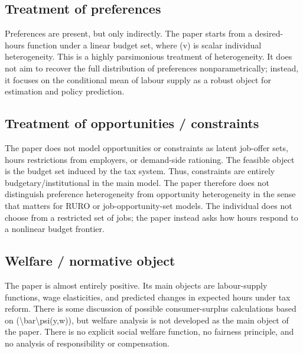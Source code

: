 \documentclass[11pt,a4paper]{article}
\begin{document}
\subsection*{Treatment of preferences}
Preferences are present, but only indirectly. The paper starts from a desired-hours function under a linear budget set, where (v) is scalar individual heterogeneity. This is a highly parsimonious treatment of heterogeneity. It does not aim to recover the full distribution of preferences nonparametrically; instead, it focuses on the conditional mean of labour supply as a robust object for estimation and policy prediction.

\subsection*{Treatment of opportunities / constraints}
The paper does not model opportunities or constraints as latent job-offer sets, hours restrictions from employers, or demand-side rationing. The feasible object is the budget set induced by the tax system. Thus, constraints are entirely budgetary/institutional in the main model. The paper therefore does not distinguish preference heterogeneity from opportunity heterogeneity in the sense that matters for RURO or job-opportunity-set models. The individual does not choose from a restricted set of jobs; the paper instead asks how hours respond to a nonlinear budget frontier.

\subsection*{Welfare / normative object}
The paper is almost entirely positive. Its main objects are labour-supply functions, wage elasticities, and predicted changes in expected hours under tax reform. There is some discussion of possible consumer-surplus calculations based on (\textbackslash{}bar\textbackslash{}psi(y,w)), but welfare analysis is not developed as the main object of the paper. There is no explicit social welfare function, no fairness principle, and no analysis of responsibility or compensation.
\end{document}
